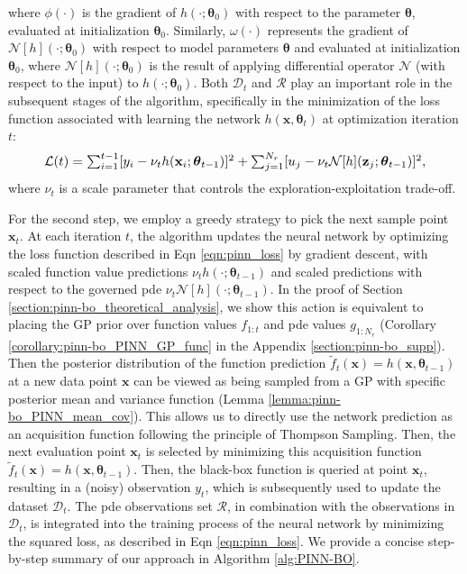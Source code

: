 where $\phi(\cdot)$ is the gradient of $h(\cdot; \boldsymbol{\theta}_0)$ with respect to the parameter $\boldsymbol{\theta}$, evaluated at initialization $\boldsymbol{\theta}_0$. Similarly, $\omega(\cdot)$ represents the gradient of $\mathcal{N}[h](\cdot; \boldsymbol{\theta}_0)$ with respect to model parameters $\boldsymbol{\theta}$ and evaluated at initialization $\boldsymbol{\theta}_0$, where $\mathcal{N}[h](\cdot; \boldsymbol{\theta}_0)$ is the result of applying differential operator $\mathcal{N}$ (with respect to the input) to $h(\cdot; \boldsymbol{\theta}_0)$. Both $\mathcal{D}_t$ and $\mathcal{R}$ play an important role in the subsequent stages of the algorithm, specifically in the minimization of the loss function associated with learning the network $h(\mathbf{x}, \boldsymbol{\theta}_t)$ at optimization iteration $t$:
\begin{equation}
    \label{eqn:pinn_loss}
    \resizebox{0.9\textwidth}{!}{
$\mathcal{L}(t) = \sum^{t-1}_{i=1} [y_i - \nu_t h(\mathbf{x}_i; \boldsymbol{\theta}_{t-1})]^2 + \sum^{N_r}_{j=1}[u_j - \nu_t \mathcal{N}[h](\mathbf{z}_j; \boldsymbol{\theta}_{t-1})]^2$,
}
\end{equation}
where $\nu_t$ is a scale parameter that controls the exploration-exploitation trade-off. 

For the second step, we employ a greedy strategy to pick the next sample point $\mathbf{x}_t$. At each iteration $t$, the algorithm updates the neural network by optimizing the loss function described in Eqn \ref{eqn:pinn_loss} by gradient descent, with scaled function value predictions $\nu_t h(\cdot; \boldsymbol{\theta}_{t-1})$ and scaled predictions with respect to the governed \ac{pde} $\nu_t \mathcal{N}[h](\cdot; \boldsymbol{\theta}_{t-1})$. In the proof of Section \ref{section:pinn-bo_theoretical_analysis}, we show this action is equivalent to placing the GP prior over function values $f_{1:t}$ and \ac{pde} values $g_{1:N_r}$ (Corollary \ref{corollary:pinn-bo_PINN_GP_func} in the Appendix \ref{section:pinn-bo_supp}). Then the posterior distribution of the function prediction $\widetilde {f}_t(\mathbf{x}) = h(\mathbf{x}, \boldsymbol{\theta}_{t-1})$ at a new data point $\mathbf{x}$ can be viewed as being sampled from a GP with specific posterior mean and variance function (Lemma \ref{lemma:pinn-bo_PINN_mean_cov}). This allows us to directly use the network prediction as an acquisition function following the principle of Thompson Sampling.  
Then, the next evaluation point $\mathbf{x}_t$ is selected by minimizing this acquisition function $\widetilde {f}_t(\mathbf{x}) = h(\mathbf{x}, \boldsymbol{\theta}_{t-1})$. Then, the black-box function is queried at point $\mathbf{x}_t$, resulting in a (noisy) observation $y_t$, which is subsequently used to update the dataset $\mathcal{D}_t$. The \ac{pde} observations set $\mathcal{R}$, in combination with the observations in $\mathcal{D}_t$, is integrated into the training process of the neural network by minimizing the squared loss, as described in Eqn \ref{eqn:pinn_loss}. We provide a concise step-by-step summary of our approach in Algorithm \ref{alg:PINN-BO}.

